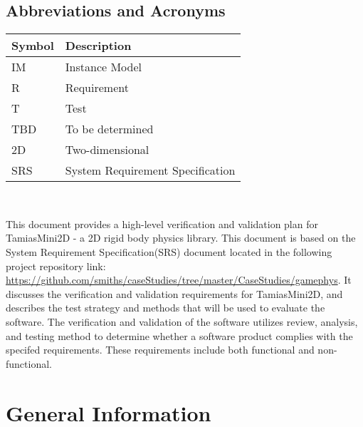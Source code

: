 \documentclass[12pt, titlepage]{article}
\begin{document}
\subsection{Abbreviations and Acronyms}
\begin{tabular}{l l} 
	\toprule		
	\textbf{Symbol} & \textbf{Description}\\
	\midrule 
	IM & Instance Model\\
	R & Requirement\\
	T & Test\\
	TBD & To be determined\\
	2D & Two-dimensional\\
	SRS & System Requirement Specification\\
	\bottomrule
\end{tabular}\\


\newpage

\tableofcontents

\listoftables

\listoffigures

\newpage


This document provides a high-level verification and validation plan for TamiasMini2D - a 2D rigid body physics library. This document is based on the System Requirement Specification(SRS) document located in the following project repository link: \url{https://github.com/smiths/caseStudies/tree/master/CaseStudies/gamephys}. It discusses the verification and validation requirements for TamiasMini2D, and describes the test strategy and methods that will be used to evaluate the software. The verification and validation of the software utilizes review, analysis, and testing method to determine whether a software product complies with the specifed requirements. These requirements include both functional and non-functional.


\section{General Information}
\end{document}
